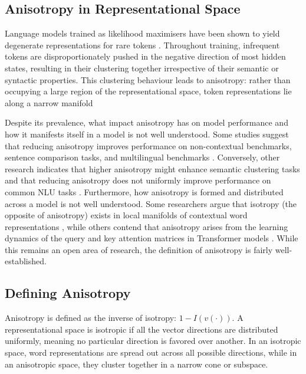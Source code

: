 \subsection{Anisotropy in Representational Space}

Language models trained as likelihood maximisers have been shown to yield degenerate representations for rare tokens \citep{gao2018representation}. Throughout training, infrequent tokens are disproportionately pushed in the negative direction of most hidden states, resulting in their clustering together irrespective of their semantic or syntactic properties. This clustering behaviour leads to anisotropy: rather than occupying a large region of the representational space, token representations lie along a narrow manifold \citep{gao2018representation, ethayarajh2019contextual}

Despite its prevalence, what impact anisotropy has on model performance and how it manifests itself in a model is not well understood. Some studies suggest that reducing anisotropy improves performance on non-contextual benchmarks, sentence comparison tasks, and multilingual benchmarks \citep{bis2021too, su2021whitening, rajaee2022isotropy}. Conversely, other research indicates that higher anisotropy might enhance semantic clustering tasks and that reducing anisotropy does not uniformly improve performance on common NLU tasks \citep{ait2023anisotropy, ding2022isotropy}. Furthermore, how anisotropy is formed and distributed across a model is not well understood. Some researchers argue that isotropy (the opposite of anisotropy) exists in local manifolds of contextual word representations \citep{cai2020isotropy}, while others contend that anisotropy arises from the learning dynamics of the query and key attention matrices in Transformer models \citep{godey2024anisotropy}. While this remains an open area of research, the definition of anisotropy is fairly well-established.

\subsection{Defining Anisotropy}

Anisotropy is defined as the inverse of isotropy: $1-I(v(\cdot))$. A representational space is isotropic if all the vector directions are distributed uniformly, meaning no particular direction is favored over another. In an isotropic space, word representations are spread out across all possible directions, while in an anisotropic space, they cluster together in a narrow cone or subspace.


